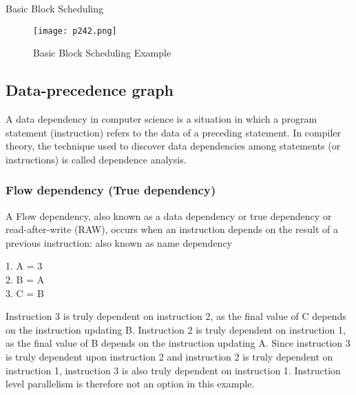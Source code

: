  \begin{algorithm}
	\caption{Basic Block Scheduling}\label{alg:Basic Block Scheduling}
	\begin{algorithmic}

        \EndWhile
	\end{algorithmic}
\end{algorithm}


\begin{figure}[H]
	\centering
	\texttt{[image: p242.png]}
	\caption{Basic Block Scheduling Example}
	\label{fig:p242}
\end{figure}




\subsection{Data-precedence graph}


A data dependency\cite{Datadepe9:online} in computer science is a situation in which a program statement (instruction) refers to the data of a preceding statement. In compiler theory, the technique used to discover data dependencies among statements (or instructions) is called dependence analysis.


\subsubsection{Flow dependency (True dependency)}

A Flow dependency, also known as a data dependency or true dependency or read-after-write (RAW), occurs when an instruction depends on the result of a previous instruction: also known as name dependency


\begin{center}
	1. A = 3\\
	2. B = A\\
	3. C = B
\end{center}
Instruction 3 is truly dependent on instruction 2, as the final value of C depends on the instruction updating B. Instruction 2 is truly dependent on instruction 1, as the final value of B depends on the instruction updating A. Since instruction 3 is truly dependent upon instruction 2 and instruction 2 is truly dependent on instruction 1, instruction 3 is also truly dependent on instruction 1. Instruction level parallelism is therefore not an option in this example.

